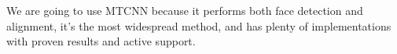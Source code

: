 \documentclass[class=report, crop=false, a4paper, 12pt]{standalone}
\begin{document}
\newpage
We are going to use MTCNN because it performs both face detection and alignment, it's the most widespread method, and has plenty of implementations with proven results and active support.
\end{document}
